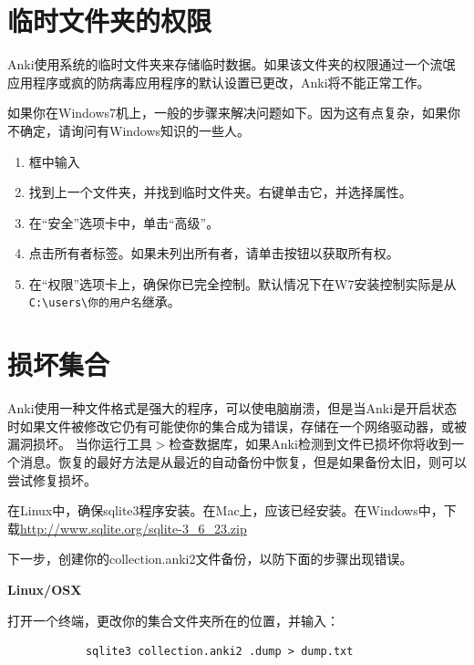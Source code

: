 \documentclass[a4paper]{book}
\begin{document}
		\section{临时文件夹的权限}
		
		Anki使用系统的临时文件夹来存储临时数据。如果该文件夹的权限通过一个流氓应用程序或疯的防病毒应用程序的默认设置已更改，Anki将不能正常工作。
		
		如果你在Windows7机上，一般的步骤来解决问题如下。因为这有点复杂，如果你不确定，请询问有Windows知识的一些人。
		
		\begin{enumerate}
			\itemsep1pt\parskip0pt
			\item 框中输入%
			\item 找到上一个文件夹，并找到临时文件夹。右键单击它，并选择属性。
			\item 在“安全”选项卡中，单击“高级”。
			\item 点击所有者标签。如果未列出所有者，请单击按钮以获取所有权。
			\item 在“权限”选项卡上，确保你已完全控制。默认情况下在W7安装控制实际是从\verb|C:\users\你的用户名|继承。
		\end{enumerate}
		
		\section{损坏集合}
		
		Anki使用一种文件格式是强大的程序，可以使电脑崩溃，但是当Anki是开启状态时如果文件被修改它仍有可能使你的集合成为错误，存储在一个网络驱动器，或被漏洞损坏。              当你运行工具$>$检查数据库，如果Anki检测到文件已损坏你将收到一个消息。恢复的最好方法是从最近的自动备份中恢复，但是如果备份太旧，则可以尝试修复损坏。
		
		在Linux中，确保sqlite3程序安装。在Mac上，应该已经安装。在Windows中，下载\url{http://www.sqlite.org/sqlite-3_6_23.zip}
		
		下一步，创建你的collection.anki2文件备份，以防下面的步骤出现错误。
		
		\textbf{Linux/OSX}
		
		打开一个终端，更改你的集合文件夹所在的位置，并输入：
		
		\begin{shaded}\begin{verbatim}
			sqlite3 collection.anki2 .dump > dump.txt
			\end{verbatim}\end{shaded}
		
\end{document}
